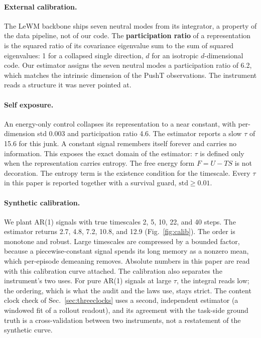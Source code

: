 \documentclass[11pt]{article}
\newcommand{\tauc}{\tau}
\newcommand{\term}[1]{\textbf{#1}}
\begin{document}
\paragraph{External calibration.}
The LeWM backbone ships seven neutral modes from its integrator, a property of the data pipeline, not of our code.
The \term{participation ratio} of a representation is the squared ratio of its covariance eigenvalue sum to the sum of squared eigenvalues: 1 for a collapsed single direction, $d$ for an isotropic $d$-dimensional code.
Our estimator assigns the seven neutral modes a participation ratio of 6.2, which matches the intrinsic dimension of the PushT observations.
The instrument reads a structure it was never pointed at.

\paragraph{Self exposure.}
An energy-only control collapses its representation to a near constant, with per-dimension std 0.003 and participation ratio 4.6.
The estimator reports a slow $\tauc$ of 15.6 for this junk.
A constant signal remembers itself forever and carries no information.
This exposes the exact domain of the estimator: $\tauc$ is defined only when the representation carries entropy.
The free energy form $F = U - T S$ is not decoration.
The entropy term is the existence condition for the timescale.
Every $\tauc$ in this paper is reported together with a survival guard, $\mathrm{std} \geq 0.01$.

\paragraph{Synthetic calibration.}
We plant AR(1) signals with true timescales 2, 5, 10, 22, and 40 steps.
The estimator returns 2.7, 4.8, 7.2, 10.8, and 12.9 (Fig.~\ref{fig:calib}).
The order is monotone and robust.
Large timescales are compressed by a bounded factor, because a piecewise-constant signal spends its long memory as a nonzero mean, which per-episode demeaning removes.
Absolute numbers in this paper are read with this calibration curve attached.
The calibration also separates the instrument's two uses.
For pure AR(1) signals at large $\tauc$, the integral reads low; the ordering, which is what the audit and the laws use, stays strict.
The content clock check of Sec.~\ref{sec:threeclocks} uses a second, independent estimator (a windowed fit of a rollout readout), and its agreement with the task-side ground truth is a cross-validation between two instruments, not a restatement of the synthetic curve.
\end{document}
